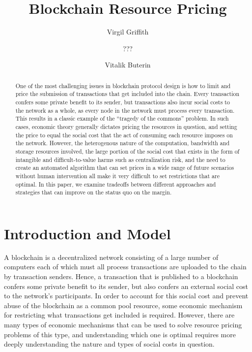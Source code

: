 \documentclass[12pt, final]{article}
\author{Virgil Griffith}
\author{???}
\author{Vitalik Buterin}
\title{Blockchain Resource Pricing}
\begin{document}
\maketitle
\vspace{-0.2in} \TODO{\today}





\begin{abstract}

One of the most challenging issues in blockchain protocol design is how to limit and price the submission of transactions that get included into the chain. Every transaction confers some private benefit to its sender, but transactions also incur social costs to the network as a whole, as every node in the network must process every transaction. This results in a classic example of the ``tragedy of the commons'' problem. In such cases, economic theory generally dictates pricing the resources in question, and setting the price to equal the social cost that the act of consuming each resource imposes on the network. However, the heterogenous nature of the computation, bandwidth and storage resources involved, the large portion of the social cost that exists in the form of intangible and difficult-to-value harms such as centralization risk, and the need to create an automated algorithm that can set prices in a wide range of future scenarios without human intervention all make it very difficult to set restrictions that are optimal. In this paper, we examine tradeoffs between different approaches and strategies that can improve on the status quo on the margin.
\end{abstract}

\section{Introduction and Model}

A blockchain is a decentralized network consisting of a large number of computers each of which must all process transactions are uploaded to the chain by transaction senders. Hence, a transaction that is published to a blockchain confers some private benefit to its sender, but also confers an external social cost to the network's participants. In order to account for this social cost and prevent abuse of the blockchain as a common pool resource, some economic mechanism for restricting what transactions get included is required. However, there are many types of economic mechanisms that can be used to solve resource pricing problems of this type, and understanding which one is optimal requires more deeply understanding the nature and types of social costs in question.
\end{document}
